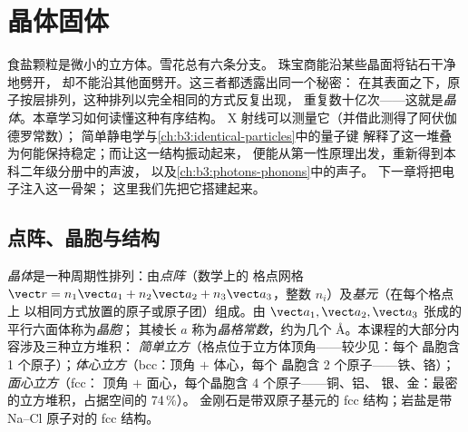 \chapter{晶体固体}\label{ch:b3:crystalline-solids}


食盐颗粒是微小的立方体。雪花总有六条分支。
珠宝商能沿某些晶面将钻石干净地劈开，
却不能沿其他面劈开。这三者都透露出同一个秘密：
在其表面之下，原子按层排列，这种排列以完全相同的方式反复出现，
重复数十亿次——这就是\emph{晶体}。本章学习如何读懂这种有序结构。
X 射线可以测量它（并借此测得了阿伏伽德罗常数）；
简单静电学与\cref{ch:b3:identical-particles}中的量子键
解释了这一堆叠为何能保持稳定；而让这一结构振动起来，
便能从第一性原理出发，重新得到本科二年级分册中的声波，
以及\cref{ch:b3:photons-phonons}中的声子。
下一章将把电子注入这一骨架；
这里我们先把它搭建起来。

\section{点阵、晶胞与结构}

\begin{definition}[点阵与基元]\label{def:b3:crystalline-solids:lattice}
\emph{晶体}是一种周期性排列：由\emph{点阵}（数学上的
格点网格 $\vect r = n_1\vect a_1 + n_2\vect a_2
+ n_3\vect a_3$，整数 $n_i$）及\emph{基元}（在每个格点上
以相同方式放置的原子或原子团）组成。由
$\vect a_1, \vect a_2, \vect a_3$ 张成的平行六面体称为\emph{晶胞}；
其棱长 $a$ 称为\emph{晶格常数}，约为几个
\unit{\angstrom}。本课程的大部分内容涉及三种立方堆积：
\emph{简单立方}（格点位于立方体顶角——较少见：每个
晶胞含 1 个原子）；\emph{体心立方}（bcc：顶角 $+$ 体心，每个
晶胞含 2 个原子——铁、铬）；\emph{面心立方}（fcc：
顶角 $+$ 面心，每个晶胞含 4 个原子——铜、铝、
银、金：最密的立方堆积，占据空间的 74\,\%）。
金刚石是带双原子基元的 fcc 结构；岩盐是带
Na--Cl 原子对的 fcc 结构。
\end{definition}

